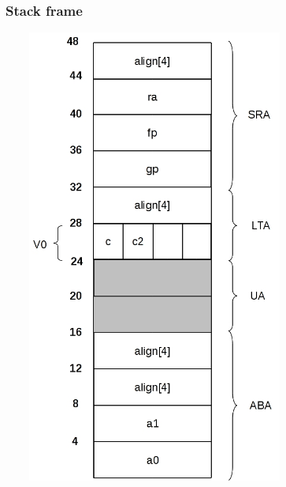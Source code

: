 \documentclass[a4paper,10pt]{article}
\begin{document}
    \subsubsection{Stack frame}
      \begin{center}
	\includegraphics[width=10cm, height=15cm]{DibujosStackFrame/stack-traducirFormato.jpg}
      \end{center}
\end{document}
